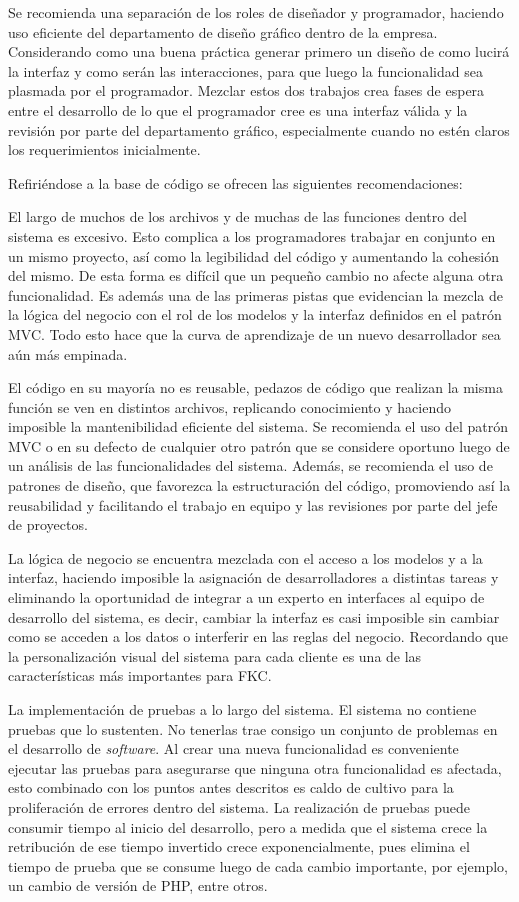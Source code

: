Se recomienda una separación de los roles de diseñador y programador, haciendo uso eficiente del departamento de diseño gráfico dentro de la empresa. Considerando como una buena práctica generar primero un diseño de como lucirá la interfaz y como serán las interacciones, para que luego la funcionalidad sea plasmada por el programador. Mezclar estos dos trabajos crea fases de espera entre el desarrollo de lo que el programador cree es una interfaz válida y la revisión por parte del departamento gráfico, especialmente cuando no estén claros los requerimientos inicialmente.

Refiriéndose a la base de código se ofrecen las siguientes recomendaciones:

El largo de muchos de los archivos y de muchas de las funciones dentro del sistema es excesivo. Esto complica a los programadores trabajar en conjunto en un mismo proyecto, así como la legibilidad del código y aumentando la cohesión del mismo. De esta forma es difícil que un pequeño cambio no afecte alguna otra funcionalidad. Es además una de las primeras pistas que evidencian la mezcla de la lógica del negocio con el rol de los modelos y la interfaz definidos en el patrón \gls{MVC}. Todo esto hace que la curva de aprendizaje de un nuevo desarrollador sea aún más empinada.

El código en su mayoría no es reusable, pedazos de código que realizan la misma función se ven en distintos archivos, replicando conocimiento y haciendo imposible la mantenibilidad eficiente del sistema. Se recomienda el uso del patrón \gls{MVC} o en su defecto de cualquier otro patrón que se considere oportuno luego de un análisis de las funcionalidades del sistema. Además, se recomienda el uso de patrones de diseño, que favorezca la estructuración del código, promoviendo así la reusabilidad y facilitando el trabajo en equipo y las revisiones por parte del jefe de proyectos.

La lógica de negocio se encuentra mezclada con el acceso a los modelos y a la interfaz, haciendo imposible la asignación de desarrolladores a distintas tareas y eliminando la oportunidad de integrar a un experto en interfaces al equipo de desarrollo del sistema, es decir, cambiar la interfaz es casi imposible sin cambiar como se acceden a los datos o interferir en las reglas del negocio. Recordando que la personalización visual del sistema para cada cliente es una de las características más importantes para FKC.

La implementación de pruebas a lo largo del sistema. El sistema no contiene pruebas que lo sustenten. No tenerlas trae consigo un conjunto de problemas en el desarrollo de \emph{software}. Al crear una nueva funcionalidad es conveniente ejecutar las pruebas para asegurarse que ninguna otra funcionalidad es afectada, esto combinado con los puntos antes descritos es caldo de cultivo para la proliferación de errores dentro del sistema. La realización de pruebas puede consumir tiempo al inicio del desarrollo, pero a medida que el sistema crece la retribución de ese tiempo invertido crece exponencialmente, pues elimina el tiempo de prueba que se consume luego de cada cambio importante, por ejemplo, un cambio de versión de PHP, entre otros.

